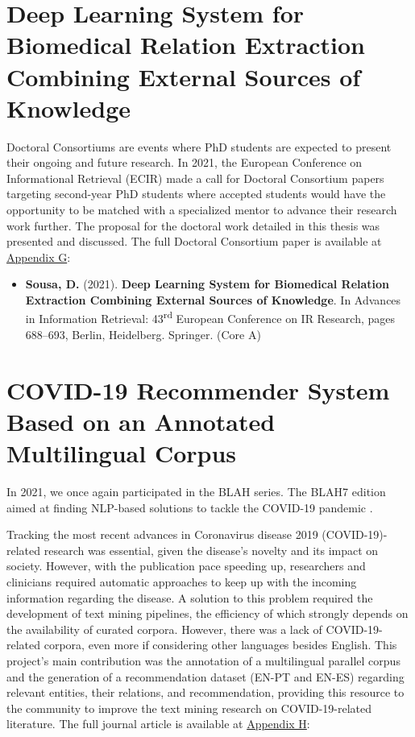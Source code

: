 \section{Deep Learning System for Biomedical Relation Extraction Combining External Sources of Knowledge}

Doctoral Consortiums are events where PhD students are expected to present their ongoing and future research. In 2021, the European Conference on Informational Retrieval (ECIR) made a call for Doctoral Consortium papers targeting second-year PhD students where accepted students would have the opportunity to be matched with a specialized mentor to advance their research work further. The proposal for the doctoral work detailed in this thesis was presented and discussed. The full Doctoral Consortium paper is available at \hyperlink{AG}{Appendix G}:

\begin{itemize}[label=]
    \item{\textbf{Sousa, D.} (2021). \textbf{Deep Learning System for Biomedical Relation Extraction Combining External Sources of Knowledge}. In Advances in Information Retrieval: 43\textsuperscript{rd} European Conference on IR Research, pages 688–693, Berlin, Heidelberg. Springer. (Core A) \citep{sousa2021deep}}
\end{itemize}

\section{COVID-19 Recommender System Based on an Annotated Multilingual Corpus}

In 2021, we once again participated in the BLAH series. The BLAH7 edition aimed at finding NLP-based solutions to tackle the COVID-19 pandemic \citep{kim2021editor}.

Tracking the most recent advances in Coronavirus disease 2019 (COVID-19)-related research was essential, given the disease's novelty and its impact on society. However, with the publication pace speeding up, researchers and clinicians required automatic approaches to keep up with the incoming information regarding the disease. A solution to this problem required the development of text mining pipelines, the efficiency of which strongly depends on the availability of curated corpora. However, there was a lack of COVID-19-related corpora, even more if considering other languages besides English. This project's main contribution was the annotation of a multilingual parallel corpus and the generation of a recommendation dataset (EN-PT and EN-ES) regarding relevant entities, their relations, and recommendation, providing this resource to the community to improve the text mining research on COVID-19-related literature. The full journal article is available at \hyperlink{AH}{Appendix H}:

